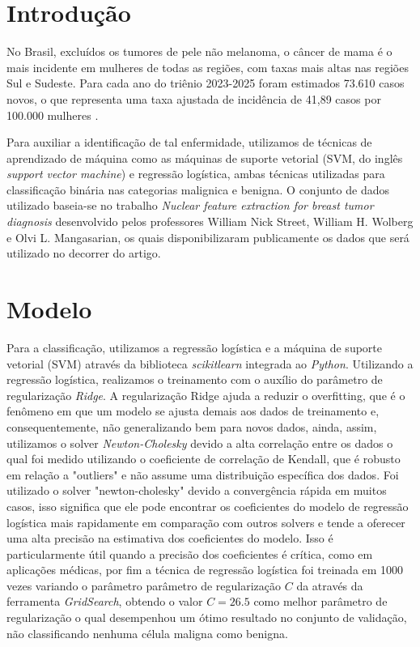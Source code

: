 \documentclass{pssbmac}
\begin{document}
\section{Introdução}

No Brasil, excluídos os tumores de pele não melanoma, o câncer de mama é o mais
incidente em mulheres de todas as regiões, com taxas mais altas nas regiões Sul e Sudeste.
Para cada ano do triênio 2023-2025 foram estimados 73.610 casos novos, o que representa
uma taxa ajustada de incidência de 41,89 casos por 100.000 mulheres \cite{INCA}. 


Para auxiliar a identificação de tal enfermidade, utilizamos de técnicas de aprendizado de máquina como as máquinas de suporte vetorial (SVM, do inglês \textit{support vector machine}) e regressão logística, ambas técnicas utilizadas para classificação binária nas categorias malignica e benigna. O conjunto de dados utilizado baseia-se no trabalho \textit{Nuclear feature extraction for breast tumor diagnosis} desenvolvido pelos professores William Nick Street, William H. Wolberg e Olvi L. Mangasarian, os quais disponibilizaram publicamente os dados que será utilizado no decorrer do artigo.

\section{Modelo}
Para a classificação, utilizamos a regressão logística e a máquina de suporte vetorial (SVM) através da biblioteca \textit{scikitlearn} integrada ao \textit{Python}. Utilizando a regressão logística, realizamos o treinamento com o auxílio do parâmetro de regularização \textit{Ridge}. A regularização Ridge ajuda a reduzir o overfitting, que é o fenômeno em que um modelo se ajusta demais aos dados de treinamento e, consequentemente, não generalizando bem para novos dados, ainda, assim, utilizamos o solver \textit{Newton-Cholesky} devido a alta correlação entre os dados o qual foi medido utilizando o coeficiente de correlação de Kendall, que é robusto em relação a "outliers" e não assume uma distribuição específica dos dados. Foi utilizado o solver "newton-cholesky" devido a convergência rápida em muitos casos, isso significa que ele pode encontrar os coeficientes do modelo de regressão logística mais rapidamente em comparação com outros solvers e tende a oferecer uma alta precisão na estimativa dos coeficientes do modelo. Isso é particularmente útil quando a precisão dos coeficientes é crítica, como em aplicações médicas, por fim a técnica de regressão logística foi treinada em 1000 vezes variando o parâmetro parâmetro de regularização $C$ da através da ferramenta \textit{GridSearch}, obtendo o valor $C=26.5$ como melhor parâmetro de regularização o qual desempenhou um ótimo resultado no conjunto de validação, não classificando nenhuma célula maligna como benigna.
\end{document}
